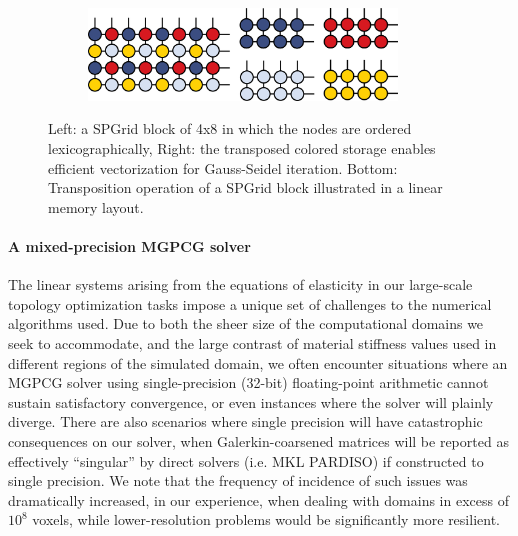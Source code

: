 \begin{figure}[t] 
\begin{subfigure}[b]{.5\textwidth}
\includegraphics[width=0.9\textwidth]{images/TopOpt/GS_Grid}\\
\end{subfigure}
\begin{subfigure}[b]{.5\textwidth}
\end{subfigure}
\caption{Left: a SPGrid block of 4x8 in which the nodes are ordered lexicographically, Right: the transposed colored storage enables efficient vectorization for Gauss-Seidel iteration.
Bottom: Transposition operation of a SPGrid block illustrated in a linear memory layout.}
\label{fig:gs_blocks}
\end{figure}

\paragraph{A mixed-precision MGPCG solver} The linear systems arising from the equations of elasticity in our large-scale topology optimization tasks impose a unique set of
challenges to the numerical algorithms used. Due to both the sheer size of the computational domains we seek to accommodate, and the large contrast of material stiffness values used in
different regions of the simulated domain, we often encounter situations where an MGPCG solver using single-precision (32-bit) floating-point arithmetic cannot sustain satisfactory
convergence, or even instances where the solver will plainly diverge. There are also scenarios where single precision will have catastrophic consequences on our solver, when
Galerkin-coarsened matrices will be reported as effectively ``singular'' by direct solvers (i.e. MKL PARDISO) if constructed to single precision. We note that the frequency of incidence
of such issues was dramatically increased, in our experience, when dealing with domains in excess of $10^8$ voxels, while lower-resolution problems would be significantly more resilient.

